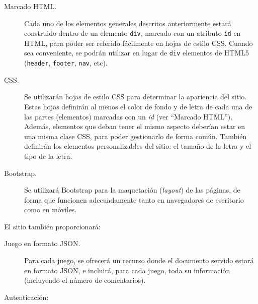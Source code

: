 \begin{description}
\item[Marcado HTML.] Cada uno de los elementos generales descritos anteriormente estará construido dentro de un elemento \texttt{div}, marcado con un atributo \texttt{id} en HTML, para poder ser referido fácilmente en hojas de estilo CSS. Cuando sea conveniente, se podrán utilizar en lugar de \texttt{div} elementos de HTML5 (\texttt{header}, \texttt{footer}, \texttt{nav}, etc).

\item[CSS.] Se utilizarán hojas de estilo CSS para determinar la apariencia del sitio. Estas hojas definirán al menos el color de fondo y de letra de cada una de las partes (elementos) marcadas con un \emph{id} (ver ``Marcado HTML''). Además, elementos que deban tener el mismo aspecto deberían estar en una misma clase CSS, para poder gestionarlo de forma común. También definirán los elementos personalizables del sitio: el tamaño de la letra y el tipo de la letra.

\item[Bootstrap.] Se utilizará Bootstrap para la maquetación (\emph{layout}) de las páginas, de forma que funcionen adecuadamente tanto en navegadores de escritorio como en móviles.
\end{description}

El sitio también proporcionará:

\begin{description}
\item[Juego en formato JSON.] Para cada juego, se ofrecerá un recurso donde el documento servido estará en formato JSON, e incluirá, para cada juego, toda su información (incluyendo el número de comentarios).

\end{description}


Autenticación:

